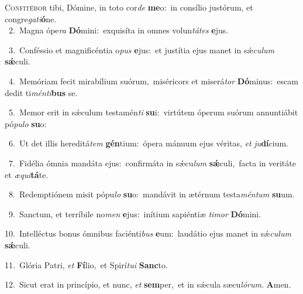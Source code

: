 \lettrine{\initial\textcolor{\initialcolor}{C}}{onfitébor} tibi, Dómine, in toto cor\textit{de} \textbf{me}\-o:~\star in consílio justórum, et congre\-\textit{ga}\-\textit{ti}\textbf{ó}ne.\\
{\numbfont\textcolor{\numbcolor}{~2.}}~Magna ópe\textit{ra} \textbf{Dó}\-mini:~\star exquisíta in omnes volun\-\textit{tá}\-\textit{tes} \textbf{e}\-jus.\par
{\numbfont\textcolor{\numbcolor}{~3.}}~Conféssio et magnificéntia o\textit{pus} \textbf{e}\-jus:~\star et justítia ejus manet in sǽ\-\textit{cu}\-\textit{lum} \textbf{sǽ}\-culi.\par
{\numbfont\textcolor{\numbcolor}{~4.}}~Memóriam fecit mirabílium suórum,~\dagger miséricors et miserá\textit{tor} \textbf{Dó}\-minus:~\star escam dedit ti\-\textit{mén}\-\textit{ti}\textbf{bus} se.\par
{\numbfont\textcolor{\numbcolor}{~5.}}~Memor erit in sǽculum testamén\textit{ti} \textbf{su}\-i:~\star virtútem óperum suórum annuntiábit pó\-\textit{pu}\-\textit{lo} \textbf{su}\-o:\par
{\numbfont\textcolor{\numbcolor}{~6.}}~Ut det illis hereditá\textit{tem} \textbf{gén}\-tium:~\star ópera mánuum ejus véritas, \textit{et} \textit{ju}\-\textbf{dí}cium.\par
{\numbfont\textcolor{\numbcolor}{~7.}}~Fidélia ómnia mandáta ejus:~\dagger confirmáta in sǽcu\textit{lum} \textbf{sǽ}\-culi,~\star facta in veritáte et \textit{æ}\-\textit{qui}\textbf{tá}te.\par
{\numbfont\textcolor{\numbcolor}{~8.}}~Redemptiónem misit pópu\textit{lo} \textbf{su}\-o:~\star mandávit in ætérnum testa\-\textit{mén}\-\textit{tum} \textbf{su}\-um.\par
{\numbfont\textcolor{\numbcolor}{~9.}}~Sanctum, et terríbile no\textit{men} \textbf{e}\-jus:~\star inítium sapiéntiæ \textit{ti}\-\textit{mor} \textbf{Dó}\-mini.\par
{\numbfont\textcolor{\numbcolor}{10.}}~Intelléctus bonus ómnibus faciénti\textit{bus} \textbf{e}\-um:~\star laudátio ejus manet in sǽ\-\textit{cu}\-\textit{lum} \textbf{sǽ}\-culi.\par
{\numbfont\textcolor{\numbcolor}{11.}}~Glória Patri, \textit{et} \textbf{Fí}\-lio,~\star et Spirí\-\textit{tu}\-\textit{i} \textbf{Sanc}\-to.\par
{\numbfont\textcolor{\numbcolor}{12.}}~Sicut erat in princípio, et nunc, \textit{et} \textbf{sem}\-per,~\star et in sǽcula sæcu\-\textit{ló}\-\textit{rum}. \textbf{A}\-men.\par
